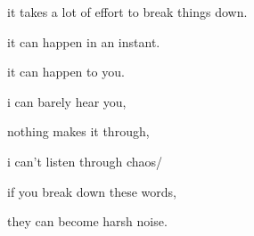\documentclass[extrafontsizes, 48pt]{memoir}
\newcommand\blankpage{%
    \null
    \thispagestyle{empty}%
    \addtocounter{page}{-1}%
    \newpage}
\begin{document}
	\begin{minipage}{.6\textwidth}
	it takes a lot of effort to break things down.
	\end{minipage}
	\newpage

	\begin{minipage}{.6\textwidth}
	it can happen in an instant.
	\end{minipage}
	\newpage

	\begin{minipage}{.6\textwidth}
	it can happen to you.
	\afterpage{\blankpage}
	\end{minipage}
	\newpage

	\begin{minipage}{.6\textwidth}
	i can barely hear you,
	\end{minipage}
	\newpage

	\begin{minipage}{.6\textwidth}
	nothing makes it through,
	\end{minipage}
	\newpage

	\begin{minipage}{.6\textwidth}
	i can't listen through chaos/
	\afterpage{\blankpage}
	\end{minipage}
	\newpage

	\begin{minipage}{.6\textwidth}
	if you break down these words,
	\end{minipage}
	\newpage

	\begin{minipage}{.6\textwidth}
	they can become harsh noise.
	\afterpage{\blankpage}
	\end{minipage}
	\newpage
\end{document}
